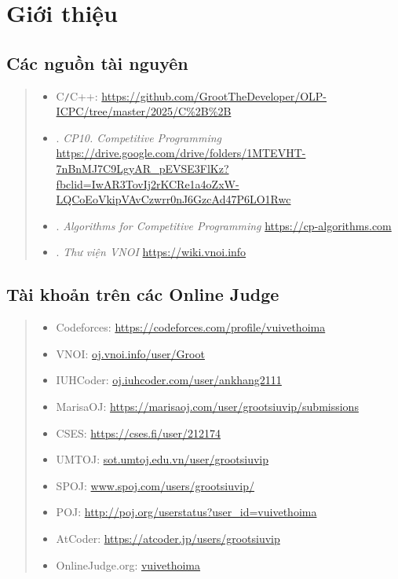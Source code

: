 \chapter{Giới thiệu}
\minitoc 

\section{Các nguồn tài nguyên}
\begin{quote}
    \begin{itemize}
        \item C{\tt/}C++: \url{https://github.com/GrootTheDeveloper/OLP-ICPC/tree/master/2025/C%2B%2B}
        \item \cite{CP10}. \textit{CP10. Competitive Programming} \url{https://drive.google.com/drive/folders/1MTEVHT-7nBnMJ7C9LgyAR_pEVSE3FlKz?fbclid=IwAR3TovIj2rKCRe1a4oZxW-LQCoEoVkipVAvCzwrr0nJ6GzcAd47P6LO1Rwc}
	
        \item \cite{cp-algorithms}. \textit{Algorithms for Competitive Programming} \url{https://cp-algorithms.com}

        \item \cite{VNOI-WIKI}. \textit{Thư viện VNOI} \url{https://wiki.vnoi.info}
    \end{itemize}
\end{quote}

\section{Tài khoản trên các Online Judge}
\begin{quote}
    \begin{itemize}
        \item Codeforces: \url{https://codeforces.com/profile/vuivethoima}
        \item VNOI: \url{oj.vnoi.info/user/Groot}
        \item IUHCoder: \url{oj.iuhcoder.com/user/ankhang2111}
        \item MarisaOJ: \url{https://marisaoj.com/user/grootsiuvip/submissions}
        \item CSES: \url{https://cses.fi/user/212174}
        \item UMTOJ: \url{sot.umtoj.edu.vn/user/grootsiuvip}
        \item SPOJ: \url{www.spoj.com/users/grootsiuvip/}
        \item POJ: \url{http://poj.org/userstatus?user_id=vuivethoima}
        \item AtCoder: \url{https://atcoder.jp/users/grootsiuvip}
        \item OnlineJudge.org: \url{vuivethoima}
    \end{itemize}
\end{quote}
